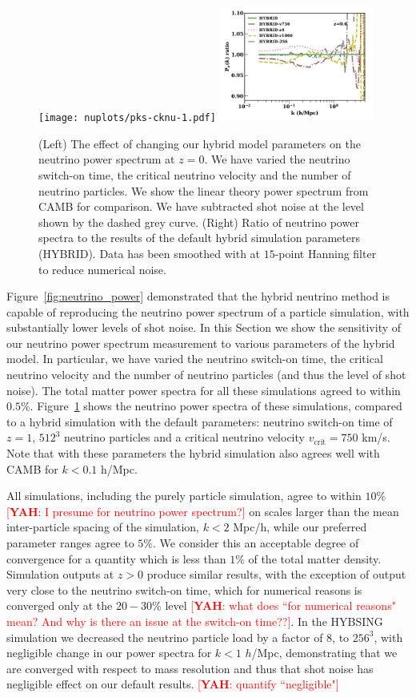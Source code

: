 \documentclass[useAMS, usenatbib]{mnras}
\newcommand{\yah}[1]{{\textcolor{red}{[{\bf YAH}: #1]}}}
\begin{document}
\begin{figure}
  \texttt{[image: nuplots/pks-cknu-1.pdf]}
  \includegraphics[width=0.45\textwidth]{nuplots/pks_nu_ckrel-1.pdf}
\caption{(Left) The effect of changing our hybrid model parameters on the neutrino power spectrum at $z=0$. We have varied the neutrino switch-on time, the critical neutrino velocity and the number of neutrino particles. We show the linear theory power spectrum from CAMB for comparison. We have subtracted shot noise at the level shown by the dashed grey curve. (Right) Ratio of neutrino power spectra to the results of the default hybrid simulation parameters (HYBRID). Data has been smoothed with at $15$-point Hanning filter to reduce numerical noise.}
  \label{fig:vcrit}
\end{figure}

Figure~\ref{fig:neutrino_power} demonstrated that the hybrid neutrino method is capable of reproducing the neutrino power spectrum of a particle simulation, with substantially lower levels of shot noise. In this Section we show the sensitivity of our neutrino power spectrum measurement to various parameters of the hybrid model. In particular, we have varied the neutrino switch-on time, the critical neutrino velocity and the number of neutrino particles (and thus the level of shot noise). The total matter power spectra for all these simulations agreed to within $0.5\%$. Figure~\ref{fig:vcrit} shows the neutrino power spectra of these simulations, compared to a hybrid simulation with the default parameters: neutrino switch-on time of $z=1$, $512^3$ neutrino particles and a critical neutrino velocity $v_\mathrm{crit} = 750$ km/s. Note that with these parameters the hybrid simulation also agrees well with CAMB for $k < 0.1$ h/Mpc. 

All simulations, including the purely particle simulation, agree to within $10\%$ \yah{I presume for neutrino power spectrum?} on scales larger than the mean inter-particle spacing of the simulation, $k < 2$ Mpc/h, while our preferred parameter ranges agree to $5\%$. We consider this an acceptable degree of convergence for a quantity which is less than $1\%$ of the total matter density. Simulation outputs at $z > 0$ produce similar results, with the exception of output very close to the neutrino switch-on time, which for numerical reasons is converged only at the $20-30\%$ level \yah{what does ``for numerical reasons" mean? And why is there an issue at the switch-on time??}. In the HYBSING simulation we decreased the neutrino particle load by a factor of $8$, to $256^3$, with negligible change in our power spectra for $k < 1$ $h$/Mpc, demonstrating that we are converged with respect to mass resolution and thus that shot noise has negligible effect on our default results. \yah{quantify ``negligible"}
\end{document}
